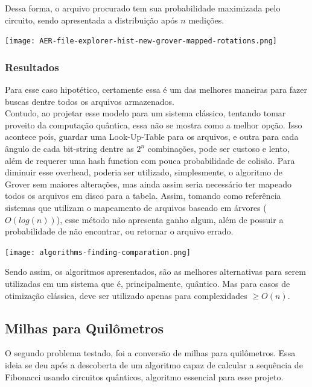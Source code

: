 \documentclass{article}
\begin{document}
Dessa forma, o arquivo procurado tem sua probabilidade maximizada pelo circuito, sendo apresentada a distribuição após $n$ medições.

\begin{center}
	\texttt{[image: AER-file-explorer-hist-new-grover-mapped-rotations.png]}
	\label{fig:file-explorer-hist}
\end{center}

\subsubsection{Resultados}

Para esse caso hipotético, certamente essa é um das melhores maneiras para fazer buscas dentre todos os arquivos armazenados.\\
Contudo, ao projetar esse modelo para um sistema clássico, tentando tomar proveito da computação quântica, essa não se mostra como a melhor opção. Isso acontece pois, guardar uma Look-Up-Table para os arquivos, e outra para cada ângulo de cada bit-string dentre as $2^{n}$ combinações, pode ser custoso e lento, além de requerer uma hash function com pouca probabilidade de colisão. Para diminuir esse overhead, poderia ser utilizado, simplesmente, o algoritmo de Grover sem maiores alterações, mas ainda assim seria necessário ter mapeado todos os arquivos em disco para a tabela. Assim, tomando como referência sistemas que utilizam o mapeamento de arquivos baseado em árvores ($O(log(n))$), esse método não apresenta ganho algum, além de possuir a probabilidade de não encontrar, ou retornar o arquivo errado.

\begin{center}
	\texttt{[image: algorithms-finding-comparation.png]}
	\label{fig:file-explorer-comparation-O}
\end{center}

Sendo assim, os algoritmos apresentados, são as melhores alternativas para serem utilizadas em um sistema que é, principalmente, quântico. Mas para casos de otimização clássica, deve ser utilizado apenas para complexidades $\ge O(n)$.


\subsection{Milhas para Quilômetros} \label{conversion}
O segundo problema testado, foi a conversão de milhas para quilômetros. Essa ideia se deu após a descoberta de um algoritmo capaz de calcular a sequência de Fibonacci usando circuitos quânticos, algoritmo essencial para esse projeto.
\end{document}
